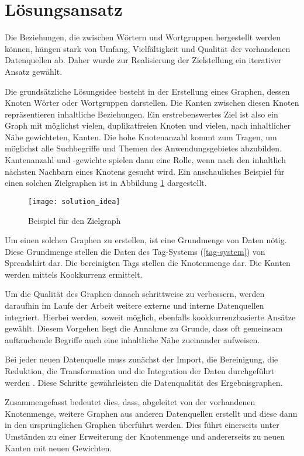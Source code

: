 \section{Lösungsansatz}
\label{solution}

Die Beziehungen, die zwischen Wörtern und Wortgruppen hergestellt werden können, hängen stark von Umfang, Vielfältigkeit und Qualität der vorhandenen Datenquellen ab. Daher wurde zur Realisierung der Zielstellung ein iterativer Ansatz gewählt.

Die grundsätzliche Lösungsidee besteht in der Erstellung eines Graphen, dessen Knoten Wörter oder Wortgruppen darstellen. Die Kanten zwischen diesen Knoten repräsentieren inhaltliche Beziehungen. Ein erstrebenswertes Ziel ist also ein Graph mit möglichst vielen, duplikatfreien Knoten und vielen, nach inhaltlicher Nähe gewichteten, Kanten. Die hohe Knotenanzahl kommt zum Tragen, um möglichst alle Suchbegriffe und Themen des Anwendungsgebietes abzubilden. Kantenanzahl und -gewichte spielen dann eine Rolle, wenn nach den inhaltlich nächsten Nachbarn eines Knotens gesucht wird. Ein anschauliches Beispiel für einen solchen Zielgraphen ist in Abbildung \ref{fig:solution_idea} dargestellt.

\begin{figure}
\centering
\texttt{[image: solution\_idea]}
\caption{Beispiel für den Zielgraph}
\label{fig:solution_idea}
\end{figure}

Um einen solchen Graphen zu erstellen, ist eine Grundmenge von Daten nötig. Diese Grundmenge stellen die Daten des Tag-Systems (\ref{tag-system}) von Spreadshirt dar. Die bereinigten Tags stellen die Knotenmenge dar. Die Kanten werden mittels Kookkurrenz ermittelt.

Um die Qualität des Graphen danach schrittweise zu verbessern, werden daraufhin im Laufe der Arbeit weitere externe und interne Datenquellen integriert. Hierbei werden, soweit möglich, ebenfalls kookkurrenzbasierte Ansätze gewählt. Diesem Vorgehen liegt die Annahme zu Grunde, dass oft gemeinsam auftauchende Begriffe auch eine inhaltliche Nähe zueinander aufweisen.

Bei jeder neuen Datenquelle muss zunächst der Import, die Bereinigung, die Reduktion, die Transformation und die Integration der Daten durchgeführt werden \cite{hkp2012}. Diese Schritte gewährleisten die Datenqualität des Ergebnisgraphen.

Zusammengefasst bedeutet dies, dass, abgeleitet von der vorhandenen Knotenmenge, weitere Graphen aus anderen Datenquellen erstellt und diese dann in den ursprünglichen Graphen überführt werden. Dies führt einerseits unter Umständen zu einer Erweiterung der Knotenmenge und andererseits zu neuen Kanten mit neuen Gewichten.

